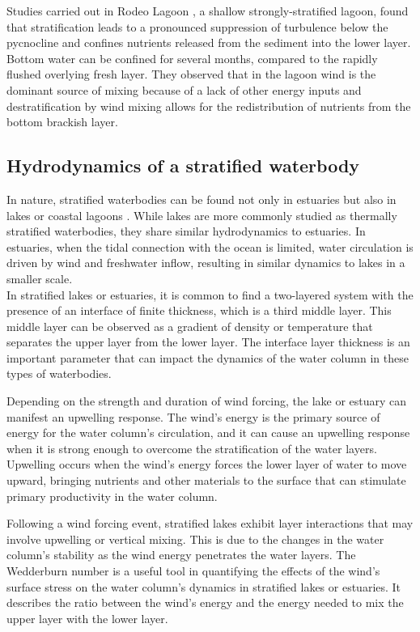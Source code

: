\documentclass[tesis.tex]{subfiles}
\begin{document}
Studies carried out in Rodeo Lagoon \citep{Cousins2010}, a shallow strongly-stratified lagoon, found that stratification leads to a pronounced suppression of turbulence below the pycnocline and confines nutrients released from the sediment into the lower layer. Bottom water can be confined for several months, compared to the rapidly flushed overlying fresh layer. They observed that in the lagoon wind is the dominant source of mixing because of a lack of other energy inputs and destratification by wind mixing allows for the redistribution of nutrients from the bottom brackish layer.\\

\subsection{Hydrodynamics of a stratified waterbody}

In nature, stratified waterbodies can be found not only in estuaries \citep{human2016} but also in lakes \citep{Valerio2012, Imam2013, Coman2012} or coastal lagoons \citep{Cousins2010}. While lakes are more commonly studied as thermally stratified waterbodies, they share similar hydrodynamics to estuaries. In estuaries, when the tidal connection with the ocean is limited, water circulation is driven by wind and freshwater inflow, resulting in similar dynamics to lakes in a smaller scale. \\

In stratified lakes or estuaries, it is common to find a two-layered system with the presence of an interface of finite thickness, which is a third middle layer. This middle layer can be observed as a gradient of density or temperature that separates the upper layer from the lower layer. The interface layer thickness is an important parameter that can impact the dynamics of the water column in these types of waterbodies.

Depending on the strength and duration of wind forcing, the lake or estuary can manifest an upwelling response. The wind's energy is the primary source of energy for the water column's circulation, and it can cause an upwelling response when it is strong enough to overcome the stratification of the water layers. Upwelling occurs when the wind's energy forces the lower layer of water to move upward, bringing nutrients and other materials to the surface that can stimulate primary productivity in the water column.

Following a wind forcing event, stratified lakes exhibit layer interactions that may involve upwelling or vertical mixing. This is due to the changes in the water column's stability as the wind energy penetrates the water layers. The Wedderburn number is a useful tool in quantifying the effects of the wind's surface stress on the water column's dynamics in stratified lakes or estuaries. It describes the ratio between the wind's energy and the energy needed to mix the upper layer with the lower layer.
\end{document}
